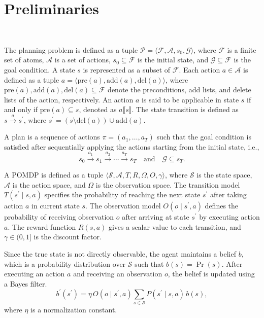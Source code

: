 \section{Preliminaries}~\label{preliminaries}

The planning problem is defined as a tuple $\mathcal{P} = \langle \mathcal{F}, \mathcal{A}, s_0, \mathcal{G} \rangle$, where $\mathcal{F}$ is a finite set of atoms, $\mathcal{A}$ is a set of actions, $s_0 \subseteq \mathcal{F}$ is the initial state, and $\mathcal{G} \subseteq \mathcal{F}$ is the goal condition. A state $s$ is represented as a subset of $\mathcal{F}$. Each action $a \in \mathcal{A}$ is defined as a tuple $a = \langle \mathrm{pre}(a), \mathrm{add}(a), \mathrm{del}(a) \rangle$, where $\mathrm{pre}(a), \mathrm{add}(a), \mathrm{del}(a) \subseteq \mathcal{F}$ denote the preconditions, add lists, and delete lists of the action, respectively. 
An action $a$ is said to be applicable in state $s$ if and only if $\mathrm{pre}(a) \subseteq s$, denoted as $a \llbracket s \rrbracket$.
The state transition is defined as $s \xrightarrow{a} s^\prime$, where $s^\prime = (s \setminus \mathrm{del}(a)) \cup \mathrm{add}(a).$

A plan is a sequence of actions $\pi = (a_1, \dots, a_T)$ such that the goal condition is satisfied after sequentially applying the actions starting from the initial state, i.e.,
\[
s_0 \xrightarrow{a_1} s_1 \xrightarrow{a_2} \cdots \xrightarrow{a_T} s_T
\quad \text{and} \quad \mathcal{G} \subseteq s_T.
\]


A POMDP is defined as a tuple $\langle \mathcal{S}, \mathcal{A}, T, R, \Omega, O, \gamma \rangle$, where $\mathcal{S}$ is the state space, $\mathcal{A}$ is the action space, and $\Omega$ is the observation space. The transition model $T(s^\prime \mid s, a)$ specifies the probability of reaching the next state $s^\prime$ after taking action $a$ in current state $s$. The observation model $O(o \mid s^\prime, a)$ defines the probability of receiving observation $o$ after arriving at state $s^\prime$ by executing action $a$. The reward function $R(s,a)$ gives a scalar value to each transition, and $\gamma \in (0,1]$ is the discount factor.

Since the true state is not directly observable, the agent maintains a belief $b$, which is a probability distribution over $\mathcal{S}$ such that $b(s) = \Pr(s)$. After executing an action $a$ and receiving an observation $o$, the belief is updated using a Bayes filter.
\[
b^\prime(s^\prime) = \eta \, O(o \mid s^\prime,a) \sum_{s \in \mathcal{S}} P(s^\prime \mid s,a) \, b(s),
\]
where $\eta$ is a normalization constant.

